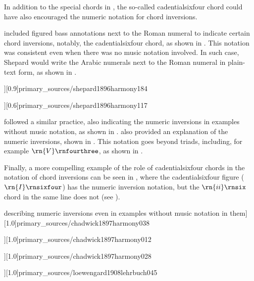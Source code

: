 In addition to the special chords in
\textcite{emery1879elements}, the so-called
\gls{cadentialsixfour} chord could have also encouraged the
numeric notation for chord inversions.

\textcite{shepard1896harmony} included figured bass
annotations next to the Roman numeral to indicate certain
chord inversions, notably, the \gls{cadentialsixfour} chord,
as shown in .
This notation was consistent even when there was no music
notation involved. In such case, Shepard would write the
Arabic numerals next to the Roman numeral in plain-text
form, as shown in
.

\phdfigure[Numeric inversions in
\textcite[p.~184]{shepard1896harmony}][0.9]{primary_sources/shepard1896harmony184}

\phdfigure[Numeric inversions in plain-text, without
accompanying music notation
\parencite[p.~117]{shepard1896harmony}][0.6]{primary_sources/shepard1896harmony117}

\textcite{chadwick1897harmony} followed a similar practice,
also indicating the numeric inversions in examples without
music notation, as shown in
.
\textcite{chadwick1897harmony} also provided an explanation
of the numeric inversions, shown in
. This
notation goes beyond triads, including, for example
$\rn{V}\rnfourthree$, as shown in
.

Finally, a more compelling example of the role of
\gls{cadentialsixfour} chords in the notation of chord
inversions can be seen in \textcite{loewengard1908lehrbuch},
where the \gls{cadentialsixfour} figure
($\rn{I}\rnsixfour$) has the numeric inversion notation, but
the $\rn{ii}\rnsix$ chord in the same line does not (see
).

\phdfigure[\textcite[p.~38]{chadwick1897harmony} describing
numeric inversions even in examples without music notation
in them][1.0]{primary_sources/chadwick1897harmony038}

\phdfigure[Arabic-numeral inversions in
 \textcite[p.~12]{chadwick1897harmony}][1.0]{primary_sources/chadwick1897harmony012}

\phdfigure[A dominant seventh chord in second inversion in
\textcite[p.~28]{chadwick1897harmony}][1.0]{primary_sources/chadwick1897harmony028}

\phdfigure[Missing first inversion of the $\rn{ii}\rnsix$
chord (measure 6) in
\textcite[p.~45]{loewengard1908lehrbuch}][1.0]{primary_sources/loewengard1908lehrbuch045}

